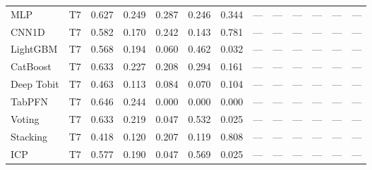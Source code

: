 \begin{table}
\begin{tabular}{lllllllllllll}
MLP & T7 & 0.627 & 0.249 & 0.287 & 0.246 & 0.344 & — & — & — & — & — & — \\
CNN1D & T7 & 0.582 & 0.170 & 0.242 & 0.143 & 0.781 & — & — & — & — & — & — \\
LightGBM & T7 & 0.568 & 0.194 & 0.060 & 0.462 & 0.032 & — & — & — & — & — & — \\
CatBoost & T7 & 0.633 & 0.227 & 0.208 & 0.294 & 0.161 & — & — & — & — & — & — \\
Deep Tobit & T7 & 0.463 & 0.113 & 0.084 & 0.070 & 0.104 & — & — & — & — & — & — \\
TabPFN & T7 & 0.646 & 0.244 & 0.000 & 0.000 & 0.000 & — & — & — & — & — & — \\
Voting & T7 & 0.633 & 0.219 & 0.047 & 0.532 & 0.025 & — & — & — & — & — & — \\
Stacking & T7 & 0.418 & 0.120 & 0.207 & 0.119 & 0.808 & — & — & — & — & — & — \\
ICP & T7 & 0.577 & 0.190 & 0.047 & 0.569 & 0.025 & — & — & — & — & — & — \\
\bottomrule
\end{tabular}
\end{table}
